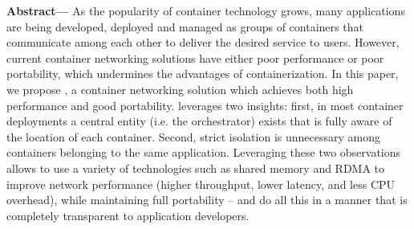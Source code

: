 \textbf{Abstract---} 
As the popularity of container technology grows, many applications are being
developed, deployed and managed as groups of containers that communicate
among each other to deliver the desired service to users.  However, current
container networking solutions have either poor performance or poor portability,
which undermines the advantages of containerization.  In this paper, we propose
\sysname, a container networking solution which achieves both high performance
and good portability. \sysname leverages two insights: first, in most container
deployments a central entity (i.e. the orchestrator) exists that is fully aware
of the location of each container. Second, strict isolation is unnecessary
among containers belonging to the same application. Leveraging these two
observations allows \sysname to use a variety of technologies such as shared
memory and RDMA to improve network performance (higher throughput, lower
latency, and less CPU overhead), while maintaining full portability -- and do
all this in a manner that is completely transparent to application developers.

